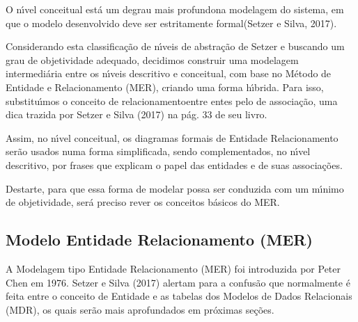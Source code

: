 \documentclass[
12pt,		%
openright,	%
twoside,  %
a4paper,			%
chapter=TITLE,		%
english,			%
french,				%
spanish,			%
brazil				%
]{USPSC-classe/USPSC}
\begin{document}
O n\'{\i}vel conceitual est\'a \textquotedbl um degrau mais profundo\textquotedbl  na modelagem do sistema, em que \textquotedbl o modelo desenvolvido deve ser estritamente formal\textquotedbl  (Setzer e Silva, 2017).









Considerando esta classifica\c{c}\~ao de n\'{\i}veis de abstra\c{c}\~ao de Setzer e buscando um grau de objetividade adequado, decidimos construir uma modelagem intermedi\'aria entre os n\'{\i}veis descritivo e conceitual, com base no M\'etodo de Entidade e Relacionamento (MER), criando uma forma h\'{\i}brida. Para isso, substitu\'{\i}mos o conceito de \textquotedbl relacionamento\textquotedbl  entre entes pelo de \textquotedbl associa\c{c}\~ao\textquotedbl , uma dica trazida por  Setzer e Silva (2017) na p\'ag. 33 de seu livro.









Assim, no n\'{\i}vel conceitual, os diagramas formais de Entidade Relacionamento ser\~ao usados numa forma simplificada, sendo complementados, no n\'{\i}vel descritivo, por frases que explicam o papel das entidades e de suas associa\c{c}\~oes.









Destarte, para que essa forma de modelar possa ser conduzida com um m\'{\i}nimo de objetividade, ser\'a preciso rever os conceitos b\'asicos do MER.









\subsection[Modelo Entidade Relacionamento (MER)]{Modelo Entidade Relacionamento (MER)}\label{Modelo Entidade Relacionamento (MER)}
A Modelagem tipo Entidade Relacionamento (MER) foi introduzida por Peter Chen em 1976. Setzer e Silva (2017) alertam para a confus\~ao que normalmente \'e feita entre o conceito de Entidade e as tabelas dos Modelos de Dados Relacionais (MDR), os quais ser\~ao mais aprofundados em pr\'oximas se\c{c}\~oes.
\end{document}
